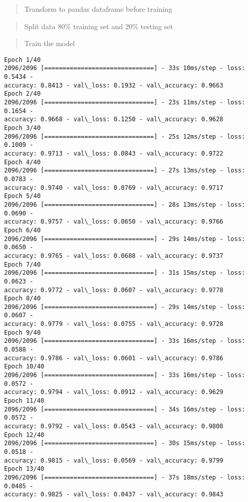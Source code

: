 \documentclass[11pt]{article}
\begin{document}
    \begin{quote}
Transform to pandas dataframe before training
\end{quote}

    \begin{quote}
Split data 80\% training set and 20\% testing set
\end{quote}

    \begin{quote}
Train the model
\end{quote}

    \begin{Verbatim}[commandchars=\\\{\}]
Epoch 1/40
2096/2096 [==============================] - 33s 10ms/step - loss: 0.5434 -
accuracy: 0.8413 - val\_loss: 0.1932 - val\_accuracy: 0.9663
Epoch 2/40
2096/2096 [==============================] - 23s 11ms/step - loss: 0.1654 -
accuracy: 0.9668 - val\_loss: 0.1250 - val\_accuracy: 0.9628
Epoch 3/40
2096/2096 [==============================] - 25s 12ms/step - loss: 0.1009 -
accuracy: 0.9713 - val\_loss: 0.0843 - val\_accuracy: 0.9722
Epoch 4/40
2096/2096 [==============================] - 27s 13ms/step - loss: 0.0783 -
accuracy: 0.9740 - val\_loss: 0.0769 - val\_accuracy: 0.9717
Epoch 5/40
2096/2096 [==============================] - 28s 13ms/step - loss: 0.0690 -
accuracy: 0.9757 - val\_loss: 0.0650 - val\_accuracy: 0.9766
Epoch 6/40
2096/2096 [==============================] - 29s 14ms/step - loss: 0.0650 -
accuracy: 0.9765 - val\_loss: 0.0688 - val\_accuracy: 0.9737
Epoch 7/40
2096/2096 [==============================] - 31s 15ms/step - loss: 0.0623 -
accuracy: 0.9772 - val\_loss: 0.0607 - val\_accuracy: 0.9778
Epoch 8/40
2096/2096 [==============================] - 29s 14ms/step - loss: 0.0607 -
accuracy: 0.9779 - val\_loss: 0.0755 - val\_accuracy: 0.9728
Epoch 9/40
2096/2096 [==============================] - 33s 16ms/step - loss: 0.0588 -
accuracy: 0.9786 - val\_loss: 0.0601 - val\_accuracy: 0.9786
Epoch 10/40
2096/2096 [==============================] - 33s 16ms/step - loss: 0.0572 -
accuracy: 0.9794 - val\_loss: 0.0912 - val\_accuracy: 0.9629
Epoch 11/40
2096/2096 [==============================] - 34s 16ms/step - loss: 0.0572 -
accuracy: 0.9792 - val\_loss: 0.0543 - val\_accuracy: 0.9808
Epoch 12/40
2096/2096 [==============================] - 30s 15ms/step - loss: 0.0518 -
accuracy: 0.9815 - val\_loss: 0.0569 - val\_accuracy: 0.9799
Epoch 13/40
2096/2096 [==============================] - 37s 18ms/step - loss: 0.0485 -
accuracy: 0.9825 - val\_loss: 0.0437 - val\_accuracy: 0.9843

\end{Verbatim}
\end{document}
